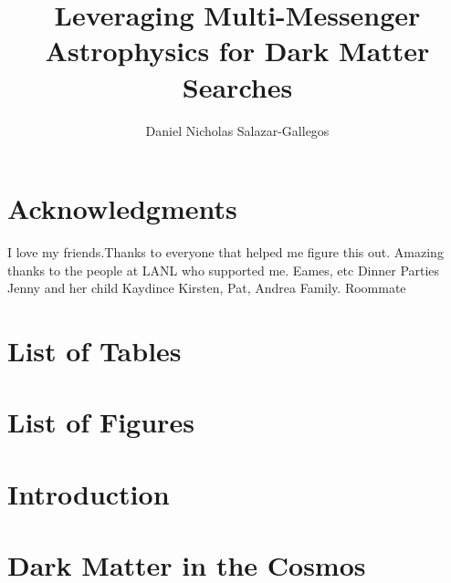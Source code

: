 \documentclass[a4paper, 12pt]{article}
\title{Leveraging Multi-Messenger Astrophysics for Dark Matter Searches}
\author{Daniel Nicholas Salazar-Gallegos}
\begin{document}
\maketitle

\pagebreak


\pagebreak

\section{Acknowledgments}
I love my friends.Thanks to everyone that helped me figure this out.
Amazing thanks to the people at LANL who supported me. Eames, etc
Dinner Parties
Jenny and her child Kaydince
Kirsten, Pat, Andrea
Family.
Roommate

\tableofcontents

\pagebreak

\section{List of Tables}\label{sec:lo_Tbl}

\section{List of Figures}\label{sec:lo_Fig}

\section{Introduction}\label{sec:intro}

\section{Dark Matter in the Cosmos}\
\end{document}
